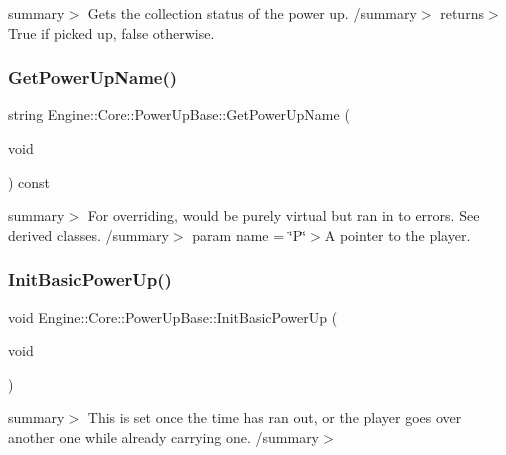 summary$>$ Gets the collection status of the power up. /summary$>$ returns$>$True if picked up, false otherwise.\mbox{\label{class_engine_1_1_core_1_1_power_up_base_a8545dee1e4beb94132acc0f03ae05a08}} 
\subsubsection{\texorpdfstring{Get\+Power\+Up\+Name()}{GetPowerUpName()}}
{\footnotesize\ttfamily string Engine\+::\+Core\+::\+Power\+Up\+Base\+::\+Get\+Power\+Up\+Name (\begin{DoxyParamCaption}\item[{void}]{ }\end{DoxyParamCaption}) const}

summary$>$ For overriding, would be purely virtual but ran in to errors. See derived classes. /summary$>$ param name = \char`\"{}\+P\char`\"{}$>$A pointer to the player.\mbox{\label{class_engine_1_1_core_1_1_power_up_base_aa60b222fd4cd9be0b8fcca5e06ba4c62}} 
\subsubsection{\texorpdfstring{Init\+Basic\+Power\+Up()}{InitBasicPowerUp()}}
{\footnotesize\ttfamily void Engine\+::\+Core\+::\+Power\+Up\+Base\+::\+Init\+Basic\+Power\+Up (\begin{DoxyParamCaption}\item[{void}]{ }\end{DoxyParamCaption})}

summary$>$ This is set once the time has ran out, or the player goes over another one while already carrying one. /summary$>$ \mbox{\label{class_engine_1_1_core_1_1_power_up_base_a1c93516694b752a8ebc42eb181cb2b78}} 
